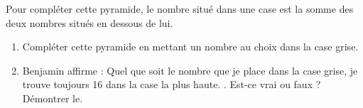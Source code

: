 \documentclass[a4paper,11pt,fleqn]{article}
\begin{document}
\exon{}

\begin{minipage}{0.4\linewidth}
	\begin{center}
\end{center}
\end{minipage}
\begin{minipage}{0.6\linewidth}
Pour compléter cette pyramide, le nombre situé dans une case est la somme des deux nombres situés en dessous de lui.

\begin{enumerate}
	\item Compléter cette pyramide en mettant un nombre au choix dans la case grise.
	\item Benjamin affirme : \og{} Quel que soit le nombre que je place dans la case grise, je trouve toujours 16 dans la case la plus haute. \fg{}. Est-ce vrai ou faux ? Démontrer le.
\end{enumerate}
\end{minipage}
\end{document}
